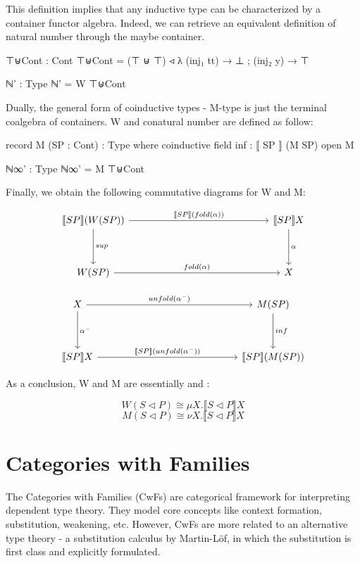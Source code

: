 This definition implies that any inductive type can be characterized by a container functor algebra. Indeed, we can retrieve an equivalent definition of natural number through the maybe container.

\begin{code}
⊤⊎Cont : Cont
⊤⊎Cont = (⊤ ⊎ ⊤) ◃ λ{ (inj₁ tt) → ⊥ ; (inj₂ y) → ⊤ }

ℕ' : Type
ℕ' = W ⊤⊎Cont
\end{code}

Dually, the general form of coinductive types - M-type is just the terminal coalgebra of containers. W and conatural number are defined as follow:

\begin{code}
record M (SP : Cont) : Type where
  coinductive
  field
    inf : ⟦ SP ⟧ (M SP)
open M

ℕ∞' : Type
ℕ∞' = M ⊤⊎Cont
\end{code}

Finally, we obtain the following commutative diagrams for W and M:

\[
\begin{tikzcd}[row sep=huge, column sep=5.0cm]
\llbracket SP \rrbracket (W(SP)) \arrow[r, "\llbracket SP \rrbracket (fold(\alpha))"] \arrow[d, "sup"]
& \llbracket SP \rrbracket X \arrow[d, "\alpha"] \\
W(SP) \arrow[r, "fold(\alpha)"]
& X
\end{tikzcd}
\]

\[
\begin{tikzcd}[row sep=huge, column sep=5.0cm]
X \arrow[r, "unfold(\alpha^{-})"] \arrow[d, "\alpha^{-}"]
& M(SP) \arrow[d, "inf"] \\
\llbracket SP \rrbracket X \arrow[r, "\llbracket SP \rrbracket (unfold(\alpha^{-}))"]
& \llbracket SP \rrbracket (M(SP))
\end{tikzcd}
\]

As a conclusion, W and M are essentially \mu and \nu:

\[ W(S \triangleleft P) \cong \mu X. \llbracket S \triangleleft P \rrbracket X \]
\[ M(S \triangleleft P) \cong \nu X. \llbracket S \triangleleft P \rrbracket X \]

\section{Categories with Families}

The Categories with Families (CwFs) are categorical framework for interpreting dependent type theory. They model core concepts like context formation, substitution, weakening, etc. However, CwFs are more related to an alternative type theory - a substitution calculus by Martin-Löf, in which the substitution is first class and explicitly formulated.

